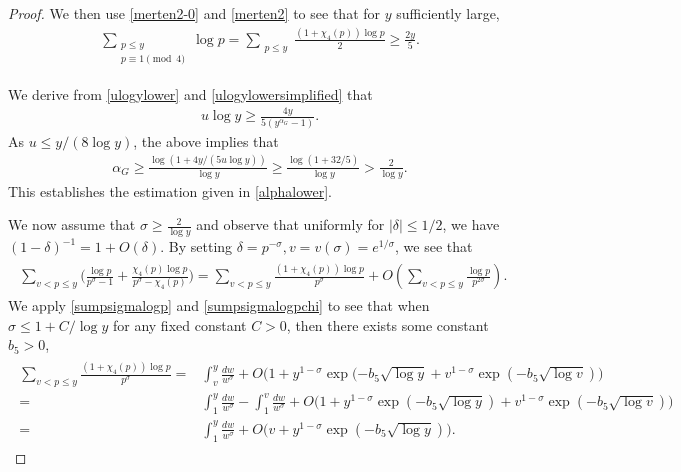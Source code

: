 \documentclass[twoside,leqno,10pt, A4]{amsart}
\begin{document}
\begin{proof}
  We then use \eqref{merten2-0} and  \eqref{merten2} to see that for $y$ sufficiently large,  
\begin{align}
\label{ulogylowersimplified}
\sum_{\substack{p \leq y \\ p \equiv 1 \pmod 4}} \log p =\sum_{\substack{p \leq y }} \frac {(1+\chi_4(p))\log p}{2} \geq \frac {2y}{5}.
\end{align}  

  We derive from \eqref{ulogylower} and \eqref{ulogylowersimplified} that
\begin{align*}
 u\log y \geq \frac {4y}{5(y^{\alpha_G}-1)}.
\end{align*} 
  As $u \leq y/(8\log y)$, the above implies that  
\begin{align*}
 \alpha_G \geq \frac {\log (1+4y/(5u\log y))}{\log y} \geq \frac {\log (1+32/5)}{\log y} > \frac {2}{\log y}. 
\end{align*}   
  This establishes the estimation given in \eqref{alphalower}.

  We now assume that $\sigma  \geq \frac {2}{\log y}$ and observe that uniformly for $|\delta| \leq 1/2$, we have $(1-\delta)^{-1}=1+O(\delta)$. By setting $\delta=p^{-\sigma}, v=v(\sigma)=e^{1/\sigma}$, we see that
\begin{align}
\label{sumpvy}
\begin{split}
  \sum_{v<p \leq y}\Big(\frac {\log p}{p^{\sigma}-1}+\frac {\chi_4(p)\log p}{p^{\sigma}-\chi_4(p)}\Big )=\sum_{v<p \leq y}\frac {(1+\chi_4(p)) \log p}{p^{\sigma}}+O(\sum_{v<p \leq y}\frac {\log p}{p^{2\sigma}}).
\end{split}
\end{align}   
  We apply \eqref{sumpsigmalogp} and \eqref{sumpsigmalogpchi} to see that when $\sigma \leq 1+C/\log y$ for any fixed constant $C>0$, then there exists some constant $b_5>0$, 
\begin{align}
\label{sumpvy1}
\begin{split}
\sum_{v<p \leq y}\frac {(1+\chi_4(p)) \log p}{p^{\sigma}} =& \int^{y}_v\frac {dw}{w^{\sigma}}+ O\Big(1+y^{1-\sigma}\exp(-b_5\sqrt{\log y}+v^{1-\sigma}\exp(-b_5\sqrt{\log v})\Big) \\
=& \int^{y}_1\frac {dw}{w^{\sigma}}-\int^{v}_1\frac {dw}{w^{\sigma}}+ O\Big(1+y^{1-\sigma}\exp(-b_5\sqrt{\log y})+v^{1-\sigma}\exp(-b_5\sqrt{\log v})\Big) \\
=& \int^{y}_1\frac {dw}{w^{\sigma}}+ O\Big(v+y^{1-\sigma}\exp(-b_5\sqrt{\log y})\Big).
\end{split}
\end{align}
  

\end{proof}
\end{document}

